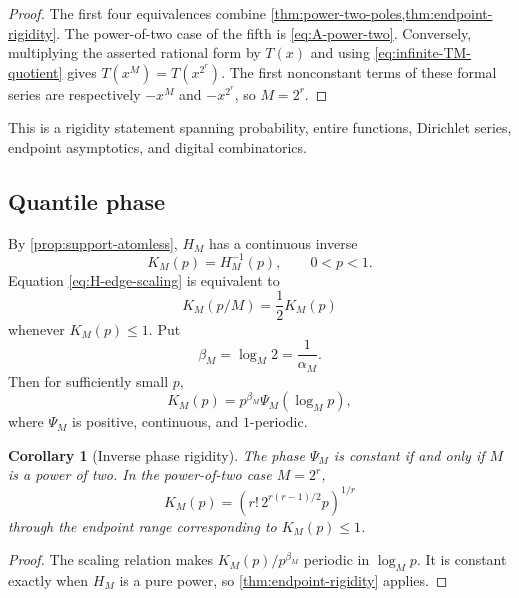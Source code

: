 \documentclass[11pt,oneside]{article}
\newtheorem{corollary}[theorem]{Corollary}
\theoremstyle{definition}
\theoremstyle{remark}
\begin{document}
\begin{proof}
The first four equivalences combine \cref{thm:power-two-poles,thm:endpoint-rigidity}.
The power-of-two case of the fifth is \eqref{eq:A-power-two}.  Conversely, multiplying the
asserted rational form by $T(x)$ and using \eqref{eq:infinite-TM-quotient} gives
$T(x^M)=T(x^{2^r})$.  The first nonconstant terms of these formal series are respectively
$-x^M$ and $-x^{2^r}$, so $M=2^r$.
\end{proof}

This is a rigidity statement spanning probability, entire functions, Dirichlet series,
endpoint asymptotics, and digital combinatorics.

\subsection{Quantile phase}

By \cref{prop:support-atomless}, $H_M$ has a continuous inverse
\begin{equation}
 K_M(p)=H_M^{-1}(p),
 \qquad 0<p<1.
 \label{eq:KM}
\end{equation}
Equation \eqref{eq:H-edge-scaling} is equivalent to
\begin{equation}
 K_M(p/M)=\frac12K_M(p)
 \label{eq:K-scaling}
\end{equation}
whenever $K_M(p)\le1$.  Put
\begin{equation}
 \beta_M=\log_M2=\frac1{\alpha_M}.
 \label{eq:betaM}
\end{equation}
Then for sufficiently small $p$,
\begin{equation}
 K_M(p)=p^{\beta_M}\Psi_M(\log_Mp),
 \label{eq:K-log-periodic}
\end{equation}
where $\Psi_M$ is positive, continuous, and $1$-periodic.

\begin{corollary}[Inverse phase rigidity]
\label{cor:inverse-phase}
The phase $\Psi_M$ is constant if and only if $M$ is a power of two.  In the power-of-two
case $M=2^r$,
\begin{equation}
 K_M(p)=
 \left(r!\,2^{r(r-1)/2}p\right)^{1/r}
 \label{eq:K-power-two}
\end{equation}
through the endpoint range corresponding to $K_M(p)\le1$.
\end{corollary}

\begin{proof}
The scaling relation makes $K_M(p)/p^{\beta_M}$ periodic in $\log_Mp$.  It is constant
exactly when $H_M$ is a pure power, so \cref{thm:endpoint-rigidity} applies.
\end{proof}
\end{document}
